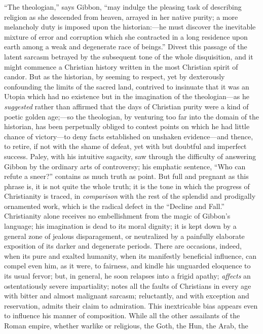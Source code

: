 “The theologian,” says Gibbon, “may indulge the pleasing task of describing
religion as she descended from heaven, arrayed in her native purity; a more
melancholy duty is imposed upon the historian:—he must discover the
inevitable mixture of error and corruption which she contracted in a long
residence upon earth among a weak and degenerate race of beings.” Divest
this passage of the latent sarcasm betrayed by the subsequent tone of the
whole disquisition, and it might commence a Christian history written in the
most Christian spirit of candor. But as the historian, by seeming to respect,
yet by dexterously confounding the limits of the sacred land, contrived to
insinuate that it was an Utopia which had no existence but in the imagination
of the theologian—as he \textit{suggested} rather than affirmed that the
days of Christian purity were a kind of poetic golden age;—so the theologian,
by venturing too far into the domain of the historian, has been perpetually
obliged to contest points on which he had little chance of victory—to deny
facts established on unshaken evidence—and thence, to retire, if not with
the shame of defeat, yet with but doubtful and imperfect success. Paley,
with his intuitive sagacity, saw through the difficulty of answering Gibbon
by the ordinary arts of controversy; his emphatic sentence, “Who can refute
a sneer?” contains as much truth as point. But full and pregnant as this
phrase is, it is not quite the whole truth; it is the tone in which the
progress of Christianity is traced, in \textit{comparison} with the rest of
the splendid and prodigally ornamented work, which is the radical defect in
the “Decline and Fall.” Christianity alone receives no embellishment from
the magic of Gibbon’s language; his imagination is dead to its moral dignity;
it is kept down by a general zone of jealous disparagement, or neutralized
by a painfully elaborate exposition of its darker and degenerate periods.
There are occasions, indeed, when its pure and exalted humanity, when its
manifestly beneficial influence, can compel even him, as it were, to fairness,
and kindle his unguarded eloquence to its usual fervor; but, in general, he
soon relapses into a frigid apathy; \textit{affects} an ostentatiously severe
impartiality; notes all the faults of Christians in every age with bitter and
almost malignant sarcasm; reluctantly, and with exception and reservation,
admits their claim to admiration. This inextricable bias appears even to
influence his manner of composition. While all the other assailants of the
Roman empire, whether warlike or religious, the Goth, the Hun, the Arab, the
